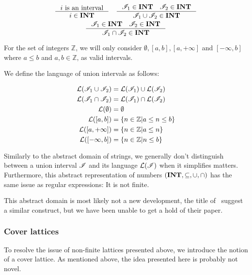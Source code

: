 \begin{gather*}
    \inference{i \text{ is an interval}}{i \in \mathbf{INT}} \quad
    \inference{\mathscr{I}_1 \in \textbf{INT} \quad \mathscr{I}_2 \in \textbf{INT}}{\mathscr{I}_1 \cup  \mathscr{I}_2 \in \mathbf{INT}}\\
    \inference{\mathscr{I}_1 \in \textbf{INT} \quad \mathscr{I}_2 \in \textbf{INT}}{\mathscr{I}_1 \cap  \mathscr{I}_2 \in \mathbf{INT}}
\end{gather*}


For the set of integers $\mathbb{Z}$, we will only consider $\emptyset, [a, b], [a, +\infty]$ and $[-\infty, b]$ where $a \leq b$ and $a, b \in \mathbb{Z}$, as valid intervals.

We define the language of union intervals as follows:


\begin{align*}
    \mathcal{L}(\mathscr{I}_1 \cup \mathscr{I}_2) &= \mathcal{L}(\mathscr{I}_1) \cup \mathcal{L}(\mathscr{I}_2) \\
    \mathcal{L}(\mathscr{I}_1 \cap \mathscr{I}_2) &= \mathcal{L}(\mathscr{I}_1) \cap \mathcal{L}(\mathscr{I}_2) \\
    \mathcal{L}(\emptyset) &= \emptyset \\
    \mathcal{L}([a, b]) &= \left\{ n \in \mathbb{Z} \middle| a \leq n \leq b \right\} \\
    \mathcal{L}([a, +\infty]) &= \left\{ n \in \mathbb{Z} \middle| a \leq n \right\} \\
    \mathcal{L}([-\infty, b]) &= \left\{ n \in \mathbb{Z} \middle| n \leq b \right\}
\end{align*}


Similarly to the abstract domain of strings, we generally don't distinguish between a union interval $\mathscr{I}$ and its language $\mathcal{L}(\mathscr{I})$ when it simplifies matters.
Furthermore, this abstract representation of numbers $(\mathbf{INT}, \subseteq, \cup, \cap)$ has the same issue as regular expressions: It is not finite.

This abstract domain is most likely not a new development, the title of~\cite{li2010abstract} suggest a similar construct, but we have been unable to get a hold of their paper.

\subsubsection{Cover lattices}\label{subsubsec:cover-lattice}
To resolve the issue of non-finite lattices presented above, we introduce the notion of a cover lattice.
As mentioned above, the idea presented here is probably not novel.


